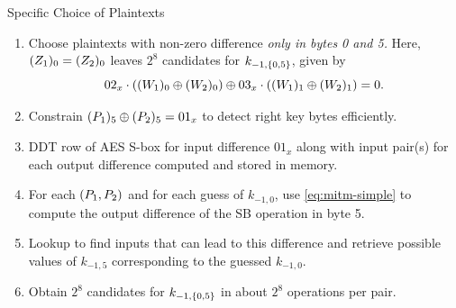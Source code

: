 \documentclass[notheorems]{beamer}
\theoremstyle{definition}
\theoremstyle{example}
\begin{document}
    \begin{frame}[<+->]{Specific Choice of Plaintexts}
        \begin{enumerate}
            \item Choose plaintexts with non-zero difference \emph{only in bytes
            0 and 5.} Here, \((Z_1)_0 = (Z_2)_0\) leaves \(2^8\)
            candidates for \(k_{-1, \{0, 5\}}\), given by
            \begin{equation}
                02_x \cdot ((W_1)_0 \oplus (W_2)_0) \oplus 03_x \cdot ((W_1)_1 \oplus (W_2)_1) = 0.
                \label{eq:mitm-simple}
            \end{equation}
            \item Constrain \((P_1)_5 \oplus (P_2)_5 = 01_x\) to
            detect right key bytes efficiently.
            \item DDT row of AES S-box for input difference \(01_x\) along with
            input pair(s) for each output difference computed and stored in
            memory.
            \item For each \((P_1, P_2)\) and for each guess of \(k_{-1,
            0}\), use \eqref{eq:mitm-simple} to compute the output difference of
            the SB operation in byte 5.
            \item Lookup to find inputs that can lead to this difference and
            retrieve possible values of \(k_{-1, 5}\) corresponding to the
            guessed \(k_{-1, 0}\).
            \item Obtain \(2^8\) candidates for \(k_{-1, \{0, 5\}}\) in
            about \(2^8\) operations per pair.
        \end{enumerate}        
    \end{frame}
\end{document}
